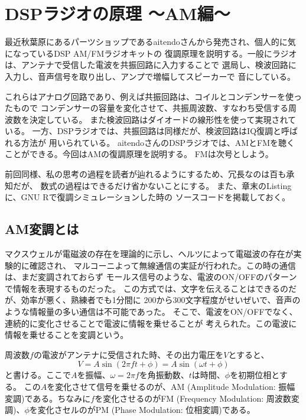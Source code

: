 \chapter*{DSPラジオの原理 〜AM編〜}
最近秋葉原にあるパーツショップであるaitendoさんから発売され、個人的に気になっているDSP AM/FMラジオキットの
復調原理を説明する。一般にラジオは、アンテナで受信した電波を共振回路に入力することで
選局し、検波回路に入力し、音声信号を取り出し、アンプで増幅してスピーカーで
音にしている。

これらはアナログ回路であり、例えば共振回路は、コイルとコンデンサーを使ったもので
コンデンサーの容量を変化させて、共振周波数、すなわち受信する周波数を決定している。
また検波回路はダイオードの線形性を使って実現されている。
一方、DSPラジオでは、共振回路は同様だが、検波回路はIQ復調と呼ばれる方法が
用いられている。
aitendoさんのDSPラジオでは、AMとFMを聴くことができる。今回はAMの復調原理を説明する。
FMは次号としよう。

前回同様、私の思考の過程を読者が辿れるようにするため、冗長なのは百も承知だが、
数式の過程はできるだけ省かないことにする。
また、章末のListing \cite{list:simulation}に、GNU Rで復調シミュレーションした時の
ソースコードを掲載しておく。

\section*{AM変調とは}
マクスウェルが電磁波の存在を理論的に示し、ヘルツによって電磁波の存在が実験的に確認され、
マルコーニよって無線通信の実証が行われた。この時の通信は、まだ変調されておらず
モールス信号のような、電波のON/OFFのパターンで情報を表現するものだった。
この方式では、文字を伝えることはできるのだが、効率が悪く、熟練者でも1分間に
200から300文字程度がせいぜいで、音声のような情報量の多い通信は不可能であった。
そこで、電波をON/OFFでなく、連続的に変化させることで電波に情報を乗せることが
考えられた。この電波に情報を乗せることを変調という。

周波数$f$の電波がアンテナに受信された時、その出力電圧を$V$とすると、
\begin{equation}
V = A\sin(2 \pi f t + \phi) = A\sin(\omega t + \phi)
\end{equation}
と書ける。ここで$A$を振幅、$\omega=2\pi f$を角振動数、$t$は時間、$\phi$を初期位相とする。
この$A$を変化させて信号を乗せるのが、AM (Amplitude Modulation: 振幅変調)である。ちなみに$f$を変化させるのがFM (Frequency Modulation: 周波数変調)、$\phi$を変化さセルのがPM (Phase Modulation: 位相変調)である。

